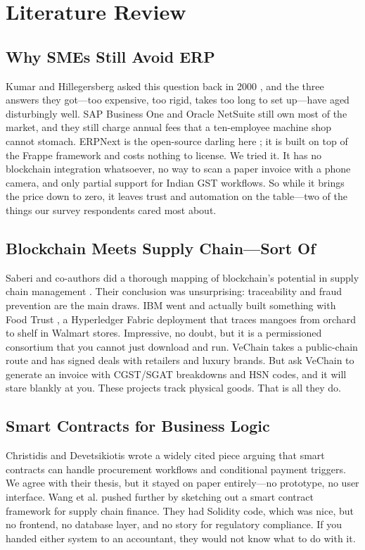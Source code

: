 \documentclass[conference]{IEEEtran}
\begin{document}
\section{Literature Review}

\subsection{Why SMEs Still Avoid ERP}
Kumar and Hillegersberg asked this question back in 2000 \cite{b5}, and the three answers they got---too expensive, too rigid, takes too long to set up---have aged disturbingly well. SAP Business One and Oracle NetSuite still own most of the market, and they still charge annual fees that a ten-employee machine shop cannot stomach. ERPNext is the open-source darling here \cite{b6}; it is built on top of the Frappe framework and costs nothing to license. We tried it. It has no blockchain integration whatsoever, no way to scan a paper invoice with a phone camera, and only partial support for Indian GST workflows. So while it brings the price down to zero, it leaves trust and automation on the table---two of the things our survey respondents cared most about.

\subsection{Blockchain Meets Supply Chain---Sort Of}
Saberi and co-authors did a thorough mapping of blockchain's potential in supply chain management \cite{b7}. Their conclusion was unsurprising: traceability and fraud prevention are the main draws. IBM went and actually built something with Food Trust \cite{b8}, a Hyperledger Fabric deployment that traces mangoes from orchard to shelf in Walmart stores. Impressive, no doubt, but it is a permissioned consortium that you cannot just download and run. VeChain \cite{b9} takes a public-chain route and has signed deals with retailers and luxury brands. But ask VeChain to generate an invoice with CGST/SGAT breakdowns and HSN codes, and it will stare blankly at you. These projects track physical goods. That is all they do.

\subsection{Smart Contracts for Business Logic}
Christidis and Devetsikiotis wrote a widely cited piece \cite{b10} arguing that smart contracts can handle procurement workflows and conditional payment triggers. We agree with their thesis, but it stayed on paper entirely---no prototype, no user interface. Wang et al. \cite{b11} pushed further by sketching out a smart contract framework for supply chain finance. They had Solidity code, which was nice, but no frontend, no database layer, and no story for regulatory compliance. If you handed either system to an accountant, they would not know what to do with it.
\end{document}

